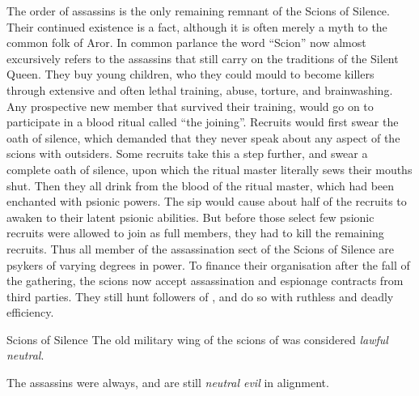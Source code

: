 The order of assassins is the only remaining remnant of the Scions of Silence.
Their continued existence is a fact, although it is often merely a myth to the
common folk of Aror. In common parlance the word ``Scion'' now almost
excursively refers to the assassins that still carry on the traditions of the
Silent Queen. They buy young children, who they could mould to become killers
through extensive and often lethal training, abuse, torture, and
brainwashing. Any prospective new member that survived their training, would
go on to participate in a blood ritual called ``the joining''.  Recruits would
first swear the oath of silence, which demanded that they never speak about
any aspect of the scions with outsiders. Some recruits take this a step
further, and swear a complete oath of silence, upon which the ritual master
literally sews their mouths shut. Then they all drink from the blood of the
ritual master, which had been enchanted with psionic powers. The sip would
cause about half of the recruits to awaken to their latent psionic
abilities. But before those select few psionic recruits were allowed to join
as full members, they had to kill the remaining recruits. Thus all member of
the assassination sect of the Scions of Silence are psykers of varying degrees
in power. To finance their organisation after the fall of the gathering, the
scions now accept assassination and espionage contracts from third parties.
They still hunt followers of , and do so with ruthless and
deadly efficiency.


\begin{35e}{Scions of Silence}
  The old military wing of the scions of was considered \emph{lawful neutral}.

  The assassins were always, and are still \emph{neutral evil} in alignment.
\end{35e}
